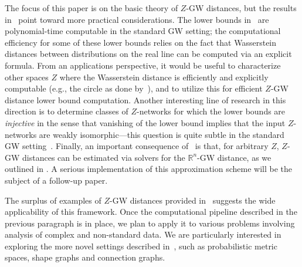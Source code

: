 \documentclass[twoside,11pt]{article}
\theoremstyle{definition}
\newcommand{\R}{\mathbb{R}}
\begin{document}
\smallskip
{} The focus of this paper is on the basic theory of $Z$-GW distances, but the results in~ point toward more practical considerations. The lower bounds in~ are polynomial-time computable in the standard GW setting; the computational efficiency for some of these lower bounds relies on the fact that Wasserstein distances between distributions on the real line can be computed via an explicit formula. From an applications perspective, it would be useful to characterize other spaces $Z$ where the Wasserstein distance is efficiently and explicitly computable (e.g., the circle as done by~\citealt{rabin2011transportation}),  and to utilize this for efficient $Z$-GW distance lower bound computation. Another interesting line of research in this direction is to determine classes of $Z$-networks for which the lower bounds are \emph{injective} in the sense that vanishing of the lower bound implies that the input $Z$-networks are weakly isomorphic---this question is quite subtle in the standard GW setting~\citep{memoli2022distance}. Finally, an important consequence of~ is that, for arbitrary $Z$, $Z$-GW distances can be estimated via solvers for the $\R^n$-GW distance, as we outlined in . A serious implementation of this approximation scheme will be the subject of a follow-up paper.

\smallskip
{} The surplus of examples of $Z$-GW distances provided in~ suggests the wide applicability of this framework. Once the computational pipeline described in the previous paragraph is in place, we plan to apply it to various problems involving analysis of complex and non-standard data. We are particularly interested in exploring the more novel settings described in~, such as probabilistic metric spaces, shape graphs and connection graphs. 


\end{document}

